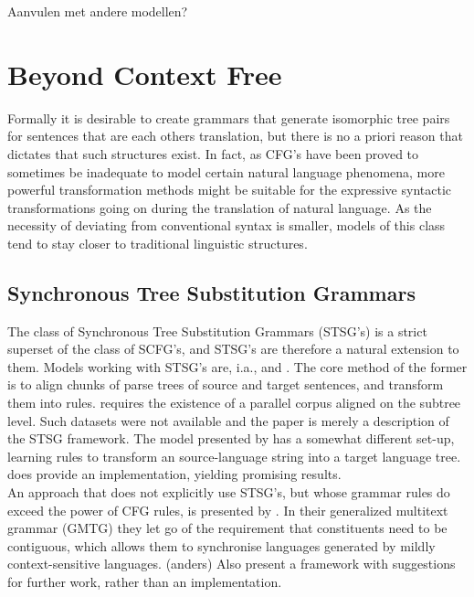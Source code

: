 \documentclass{report}
\theoremstyle{definition}
\theoremstyle{plain}
\begin{document}
Aanvulen met andere modellen?



\section{Beyond Context Free}
\label{sec:bcf}

Formally it is desirable to create grammars that generate isomorphic tree pairs for sentences that are each others translation, but there is no a priori reason that dictates that such structures exist. In fact, as CFG's have been proved to sometimes be inadequate to model certain natural language phenomena, more powerful transformation methods might be suitable for the expressive syntactic transformations going on during the translation of natural language. As the necessity of deviating from conventional syntax is smaller, models of this class tend to stay closer to traditional linguistic structures.

\subsection{Synchronous Tree Substitution Grammars}

The class of Synchronous Tree Substitution Grammars (STSG's) is a strict superset of the class of SCFG's, and STSG's are therefore a natural extension to them. Models working with STSG's are, i.a., \cite{poutsma2000data} and \cite{galley2004s,galley2006scalable}. The core method of the former is to align chunks of parse trees of source and target sentences, and transform them into rules. \cite{poutsma2000data} requires the existence of a parallel corpus aligned on the subtree level. Such datasets were not available and the paper is merely a description of the STSG framework.  The model presented by \citeauthor{galley2004s} has a somewhat different set-up, learning rules to transform an source-language string into a target language tree. \cite{galley2006scalable} does provide an implementation, yielding promising results.\\
An approach that does not explicitly use STSG's, but whose grammar rules do exceed the power of CFG rules, is presented by \cite{melamed2004generalized}. In their generalized multitext grammar (GMTG) they let go of the requirement that constituents need to be contiguous, which allows them to synchronise languages generated by mildly context-sensitive languages. (anders) Also \citeauthor{melamed2004generalized} present a framework with suggestions for further work, rather than an implementation.
\end{document}
